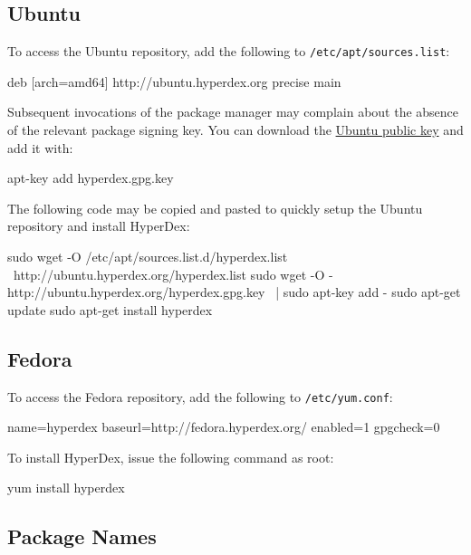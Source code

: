 \subsection{Ubuntu}
\label{sec:installation:binaries:ubuntu}

To access the Ubuntu repository, add the following to
\texttt{/etc/apt/sources.list}:

\begin{consolecode}
deb [arch=amd64] http://ubuntu.hyperdex.org precise main
\end{consolecode}

Subsequent invocations of the package manager may complain about the absence of
the relevant package signing key.  You can download the
\href{http://ubuntu.hyperdex.org/hyperdex.gpg.key}{Ubuntu public key} and add
it with:

\begin{consolecode}
apt-key add hyperdex.gpg.key
\end{consolecode}

The following code may be copied and pasted to quickly setup the Ubuntu
repository and install HyperDex:

\begin{consolecode}
sudo wget -O /etc/apt/sources.list.d/hyperdex.list \
    http://ubuntu.hyperdex.org/hyperdex.list
sudo wget -O - http://ubuntu.hyperdex.org/hyperdex.gpg.key \
| sudo apt-key add -
sudo apt-get update
sudo apt-get install hyperdex
\end{consolecode}

\subsection{Fedora}
\label{sec:installation:binaries:fedora}

To access the Fedora repository, add the following to \texttt{/etc/yum.conf}:

\begin{consolecode}
[hyperdex]
name=hyperdex
baseurl=http://fedora.hyperdex.org/
enabled=1
gpgcheck=0
\end{consolecode}

To install HyperDex, issue the following command as root:

\begin{consolecode}
yum install hyperdex
\end{consolecode}

\subsection{Package Names}
\label{sec:installation:package-names}

